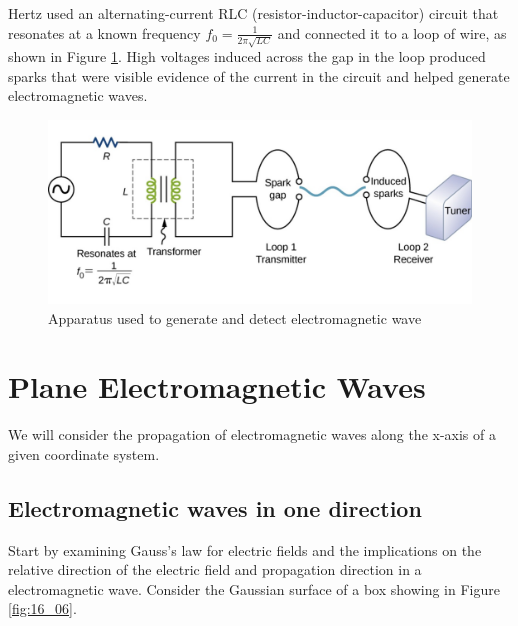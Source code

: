 \documentclass[14pt]{memoir}
\begin{document}
Hertz used an alternating-current RLC (resistor-inductor-capacitor) circuit that resonates at a known frequency  $f_0 = \frac{1}{2 \pi \sqrt{LC}}$ and connected it to a loop of wire, as shown in Figure \ref{fig:16_05}. High voltages induced across the gap in the loop produced sparks that were visible evidence of the current in the circuit and helped generate electromagnetic waves.

\begin{figure}[H]
\begin{center}
\includegraphics[scale=0.5]{fig/fig_16_05.jpg}
\caption{Apparatus used to generate and detect electromagnetic wave}
\label{fig:16_05}
\end{center}
\end{figure}


\section{Plane Electromagnetic Waves}

We will consider the propagation of electromagnetic waves along the x-axis of a given coordinate system. 

\subsection{Electromagnetic waves in one direction}
Start by examining Gauss's law for electric fields and the implications on the relative direction of the electric field and propagation direction in a electromagnetic wave.  Consider the Gaussian surface of a box showing in Figure \ref{fig:16_06}. 
\end{document}
